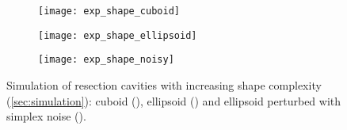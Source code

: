 \begin{figure}
  \centering
  \captionsetup[subfigure]{aboveskip=3pt, belowskip=5pt}

  \begin{subfigure}{0.32\textwidth}
    \texttt{[image: exp\_shape\_cuboid]}
    \caption{\label{fig:exp_shape_cuboid}}
  \end{subfigure}
  \hfill
  \begin{subfigure}{0.32\textwidth}
    \texttt{[image: exp\_shape\_ellipsoid]}
    \caption{\label{fig:exp_shape_ellipsoid}}
  \end{subfigure}
  \hfill
  \begin{subfigure}{0.32\textwidth}
    \texttt{[image: exp\_shape\_noisy]}
    \caption{\label{fig:exp_shape_noisy}}
  \end{subfigure}

  \caption[Simulation of resection cavities with increasing complexity]{
    Simulation of resection cavities with increasing shape complexity (\cref{sec:simulation}):
    cuboid (),
    ellipsoid ()
    and ellipsoid perturbed with simplex noise ().
  }
  \label{fig:exp_shape}
\end{figure}
